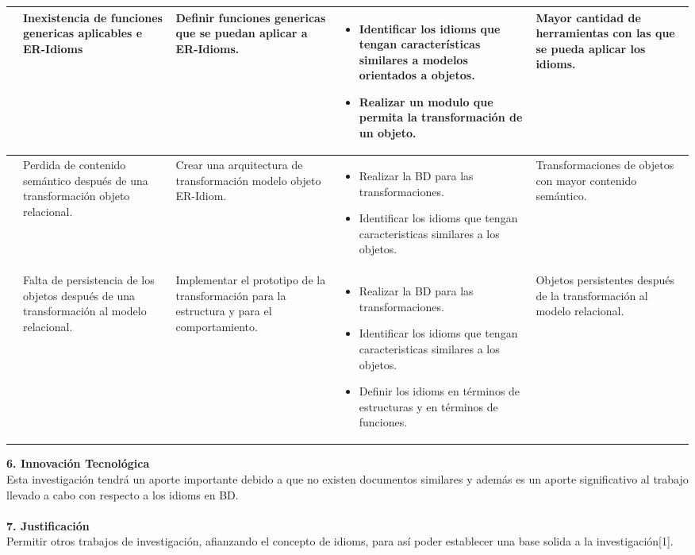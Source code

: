 \begin{flushleft}
\begin{longtable}{|p{2.8cm}| p{2.8cm}| p{2.8cm}| p{2.8cm}| p{2.8cm}|}
	&
	{Inexistencia de funciones genericas aplicables e ER-Idioms} & Definir funciones genericas que se puedan aplicar a ER-Idioms.
	&
	\parbox {2.8cm}{
		\begin{itemize}
			\item Identificar los idioms que tengan características similares a modelos orientados a objetos.
			\item Realizar un modulo que permita la transformación de un objeto.
		\end{itemize}}
	& Mayor cantidad de herramientas con las que se pueda aplicar los idioms.\\ \hline
	&
	{Perdida de contenido semántico después de una transformación objeto relacional.}
	&
	Crear una arquitectura de transformación modelo objeto ER-Idiom. &
	\parbox{2.8cm} {
		\begin{itemize}
			\item Realizar la BD para las transformaciones.
			\item Identificar los idioms que tengan caracteristicas similares a los objetos.
		\end{itemize}}
	&
    Transformaciones de objetos con mayor contenido semántico. \\ \hline
    &
    {Falta de persistencia de los objetos después de una transformación al modelo relacional.} &
    Implementar el prototipo de la transformación para la estructura y para el comportamiento.
    &
    \parbox{2.8cm}{
    	\begin{itemize}
    		\item Realizar la BD para las transformaciones.
    		\item Identificar los idioms que tengan caracteristicas similares a los objetos.
    		\item Definir los idioms en términos de estructuras y en términos de funciones.
    	\end{itemize}}
    	&
    	Objetos persistentes después de la transformación al modelo relacional.\\ \hline
\end{longtable}
\textbf{6. Innovación Tecnológica}\\
{Esta investigación tendrá un aporte importante debido a que no existen documentos similares y además es un aporte significativo al trabajo llevado a cabo con respecto a los idioms en BD.}\\
\\ \textbf{7. Justificación}\\
{Permitir otros trabajos de investigación, afianzando el concepto de idioms, para así poder establecer una base solida a la investigación[1].} \par

\end{flushleft}
